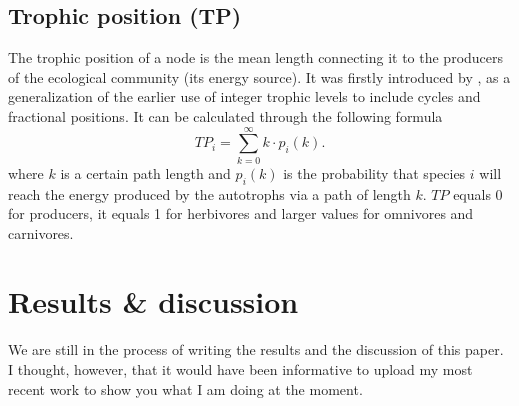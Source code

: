 \documentclass[twocolumn]{article}
\begin{document}
	\subsection*{Trophic position (TP)}
		The trophic position of a node is the mean length connecting it to the producers of the ecological community (its energy source). It was firstly introduced by \citet{Levine1980}, as a generalization of the earlier use of integer trophic levels to include cycles and fractional positions. It can be calculated through the following formula
		\begin{equation}
			TP_i=\sum\limits_{k=0}^\infty k \cdot p_i(k).
		\end{equation}
		where $k$ is a certain path length and $p_i(k)$ is the probability that species $i$ will reach the energy produced by the autotrophs via a path of length $k$. $TP$ equals 0 for producers, it equals 1 for herbivores and larger values for omnivores and carnivores.
\section*{Results \& discussion}
	We are still in the process of writing the results and the discussion of this paper. I thought, however, that it would have been informative to upload my most recent work to show you what I am doing at the moment.
\end{document}
